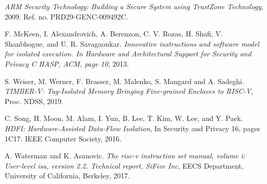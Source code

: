 \documentclass[conference]{IEEEtran}
\begin{document}
\begin{thebibliography}{1}

\emph{ARM Security Technology: Building a Secure System using TrustZone Technology}, 2009. Ref. no. PRD29-GENC-009492C.

F. McKeen, I. Alexandrovich, A. Berenzon, C. V. Rozas, H. Shafi, V. Shanbhogue, and U. R. Savagaonkar.
\emph{Innovative instructions and software model for isolated execution. In Hardware and Architectural
Support for Security and Privacy C HASP, ACM, page 10}, 2013. 

S. Weiser, M. Werner, F. Brasser, M. Malenko, S. Mangard and A. Sadeghi.
\emph{TIMBER-V: Tag-Isolated Memory Bringing Fine-grained Enclaves to RISC-V},
Proc. NDSS, 2019.

C. Song, H. Moon, M. Alam, I. Yun, B. Lee, T. Kim, W. Lee, and Y. Paek. 
\emph{HDFI: Hardware-Assisted Data-Flow Isolation},
In Security and Privacy 16, pages 1C17. IEEE Computer Society, 2016.

A. Waterman and K. Asanovic. 
\emph{The risc-v instruction set manual,
volume i: User-level isa, version 2.2. Technical report, SiFive Inc},
EECS Department, University of California, Berkeley, 2017.

\end{thebibliography}
\end{document}
